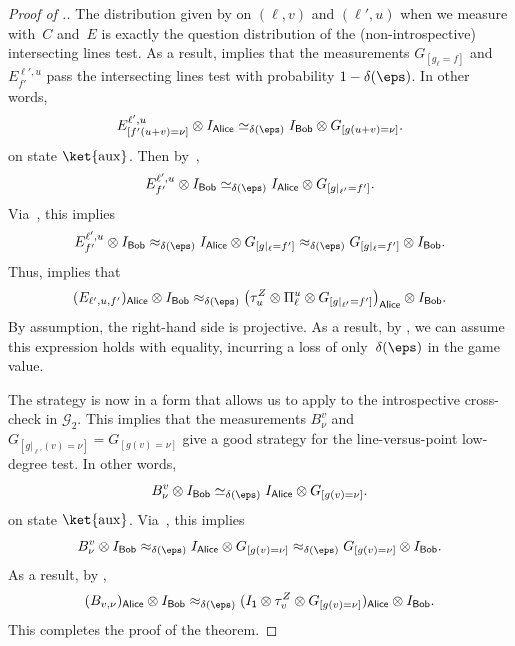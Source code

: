 \documentclass[11pt]{article}
\newcommand{\consistency}{\simeq}
\newcommand{\game}{\mathscr{G}}
\newcommand{\reg}[1]{{\mathsf{#1}}}
\begin{document}
\begin{proof}[Proof of .]
The distribution given by on $(\ell, v)$ and $(\ell', u)$ when we measure with~$C$ and~$E$ is exactly
the question distribution of the (non-introspective) intersecting lines test.
As a result,  implies that
the measurements $G_{[g_{\ell} = f]}$ and $E^{\ell', u}_{f'}$ pass the intersecting lines test with probability $1-\delta(\eps)$.
In other words,
\begin{equation*}
E^{\ell',u}_{[f'(u+v) = \nu]} \otimes I_{\reg{Alice}}
\consistency_{\delta(\eps)} I_{\reg{Bob}} \otimes G_{[g(u+v) = \nu]}.
\end{equation*}
on state $\ket{\mathrm{aux}}$.
Then by~, 
\begin{equation*}
E^{\ell',u}_{f'} \otimes I_{\reg{Bob}}
\consistency_{\delta(\eps)} I_{\reg{Alice}} \otimes G_{[g|_{\ell'} = f']}.
\end{equation*}
Via~, this implies
\begin{equation*}
E^{\ell',u}_{f'} \otimes I_{\reg{Bob}}
\approx_{\delta(\eps)} I_{\reg{Alice}} \otimes G_{[g|_{\ell} = f']}
\approx_{\delta(\eps)} G_{[g|_{\ell} = f']} \otimes I_{\reg{Bob}}.
\end{equation*}
Thus,  implies that
\begin{equation*}
(E_{\ell', u, f'})_{\reg{Alice}} \otimes I_{\reg{Bob}}
\approx_{\delta(\eps)} \left(\tau_u^Z \otimes \Pi_{\ell}^u \otimes G_{[g|_{\ell'} = f']}\right)_{\reg{Alice}} \otimes I_{\reg{Bob}}.
\end{equation*}
By assumption, the right-hand side is projective.
As a result, by , we can assume this expression holds with equality, incurring a loss of only~$\delta(\eps)$ in the game value.

The strategy is now in a form that allows us to apply 
to the introspective cross-check in $\game_2$.
This implies that the measurements $B^v_{\nu}$ and $G_{[g|_{\ell'}(v) = \nu]} = G_{[g(v) = \nu]}$  give a good strategy for the line-versus-point low-degree test. In other words,
\begin{equation*}
B^v_{\nu} \otimes I_{\reg{Bob}} \consistency_{\delta(\eps)} I_{\reg{Alice}} \otimes G_{[g(v)=\nu]}.
\end{equation*}
on state $\ket{\mathrm{aux}}$.
Via~, this implies
\begin{equation*}
B^{v}_{\nu} \otimes I_{\reg{Bob}}
\approx_{\delta(\eps)} I_{\reg{Alice}} \otimes G_{[g(v) = \nu]}
\approx_{\delta(\eps)} G_{[g(v) = \nu]} \otimes I_{\reg{Bob}}.
\end{equation*}
As a result, by ,
\begin{equation*}
(B_{v, \nu})_{\reg{Alice}} \otimes I_{\reg{Bob}} \approx_{\delta(\eps)} (I_{\reg{1}} \otimes \tau_v^Z \otimes G_{[g(v) = \nu]})_{\reg{Alice}} \otimes I_{\reg{Bob}}.
\end{equation*}
This completes the proof of the theorem.
\end{proof}
\end{document}

